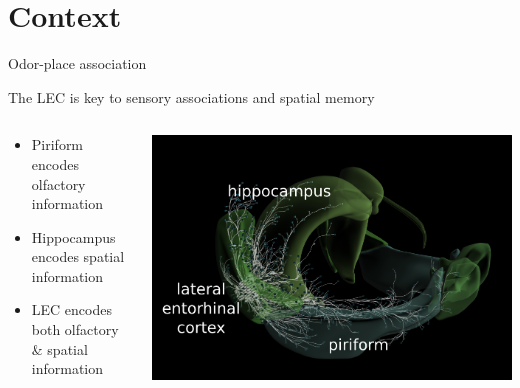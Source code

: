 \documentclass[bigger]{beamer}
\begin{document}
\section*{Context}
\label{sec:org57d55e8}
{%
\begin{frame}[fragile]{Odor-place association}
\addtocounter{framenumber}{-1}
\end{frame}
}
\begin{frame}[<+->][label={sec:org0493af8}]{The LEC is key to sensory associations and spatial memory}
\begin{columns}
\begin{column}{0.45\columnwidth}
\footnotesize
\begin{itemize}
\item \alert{Piriform} encodes olfactory information
\item \alert{Hippocampus} encodes spatial information
\item \alert{LEC} encodes both olfactory \& spatial information
\end{itemize}
\end{column}
\begin{column}{0.55\columnwidth}
\begin{center}
\includegraphics[width=\textwidth]{img/brain.png}
\end{center}
\end{column}
\end{columns}
\end{frame}
\end{document}

